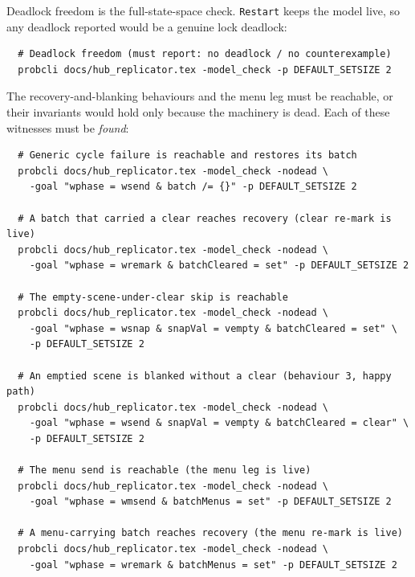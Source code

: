 \documentclass[a4paper,10pt,fleqn]{article}
\begin{document}
Deadlock freedom is the full-state-space check.  \texttt{Restart} keeps the
model live, so any deadlock reported would be a genuine lock deadlock:
\begin{verbatim}
  # Deadlock freedom (must report: no deadlock / no counterexample)
  probcli docs/hub_replicator.tex -model_check -p DEFAULT_SETSIZE 2
\end{verbatim}

The recovery-and-blanking behaviours and the menu leg must be reachable, or
their invariants would hold only because the machinery is dead.  Each of these
witnesses must be \emph{found}:
\begin{verbatim}
  # Generic cycle failure is reachable and restores its batch
  probcli docs/hub_replicator.tex -model_check -nodead \
    -goal "wphase = wsend & batch /= {}" -p DEFAULT_SETSIZE 2

  # A batch that carried a clear reaches recovery (clear re-mark is live)
  probcli docs/hub_replicator.tex -model_check -nodead \
    -goal "wphase = wremark & batchCleared = set" -p DEFAULT_SETSIZE 2

  # The empty-scene-under-clear skip is reachable
  probcli docs/hub_replicator.tex -model_check -nodead \
    -goal "wphase = wsnap & snapVal = vempty & batchCleared = set" \
    -p DEFAULT_SETSIZE 2

  # An emptied scene is blanked without a clear (behaviour 3, happy path)
  probcli docs/hub_replicator.tex -model_check -nodead \
    -goal "wphase = wsend & snapVal = vempty & batchCleared = clear" \
    -p DEFAULT_SETSIZE 2

  # The menu send is reachable (the menu leg is live)
  probcli docs/hub_replicator.tex -model_check -nodead \
    -goal "wphase = wmsend & batchMenus = set" -p DEFAULT_SETSIZE 2

  # A menu-carrying batch reaches recovery (the menu re-mark is live)
  probcli docs/hub_replicator.tex -model_check -nodead \
    -goal "wphase = wremark & batchMenus = set" -p DEFAULT_SETSIZE 2
\end{verbatim}
\end{document}
